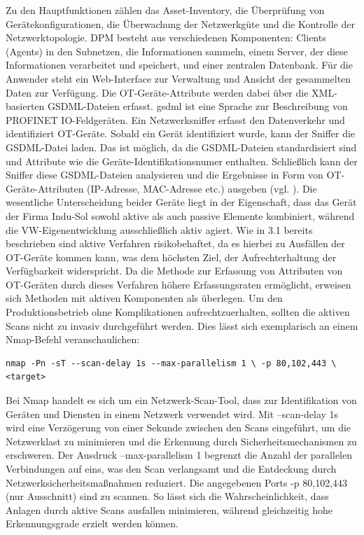 Zu den Hauptfunktionen zählen das Asset-Inventory, die Überprüfung von Gerätekonfigurationen, die Überwachung der Netzwerkgüte und die Kontrolle der Netzwerktopologie. DPM besteht aus verschiedenen Komponenten: Clients (Agents) in den Subnetzen, die Informationen sammeln, einem Server, der diese Informationen verarbeitet und speichert, und einer zentralen Datenbank. Für die Anwender steht ein Web-Interface zur Verwaltung und Ansicht der gesammelten Daten zur Verfügung. Die OT-Geräte-Attribute werden dabei über die XML-basierten GSDML-Dateien erfasst.  \ac{gsdml} ist eine Sprache zur Beschreibung von PROFINET IO-Feldgeräten. Ein Netzwerksniffer erfasst den Datenverkehr und identifiziert OT-Geräte. Sobald ein Gerät identifiziert wurde, kann der Sniffer die GSDML-Datei laden. Das ist möglich, da die GSDML-Dateien standardisiert sind und Attribute wie die Geräte-Identifikationsnumer enthalten. \noindent \clearpage Schließlich kann der Sniffer diese GSDML-Dateien analysieren und die Ergebnisse in Form von OT-Geräte-Attributen (IP-Adresse, MAC-Adresse etc.) ausgeben (vgl. \cite{SIEMENS}). Die wesentliche Unterscheidung beider Geräte liegt in der Eigenschaft, dass das Gerät der Firma Indu-Sol sowohl aktive als auch passive Elemente kombiniert, während die VW-Eigenentwicklung ausschließlich aktiv agiert. Wie in 3.1 bereits beschrieben sind aktive Verfahren risikobehaftet, da es hierbei zu Ausfällen der OT-Geräte kommen kann, was dem höchsten Ziel, der Aufrechterhaltung der Verfügbarkeit widerspricht. Da die Methode zur Erfassung von Attributen von OT-Geräten durch dieses Verfahren höhere Erfassungsraten ermöglicht, erweisen sich Methoden mit aktiven Komponenten als überlegen. Um den Produktionsbetrieb ohne Komplikationen aufrechtzuerhalten, sollten die aktiven Scans nicht zu invasiv durchgeführt werden. Dies lässt sich exemplarisch an einem Nmap-Befehl veranschaulichen: 

\bigskip
\begin{verbatim}
nmap -Pn -sT --scan-delay 1s --max-parallelism 1 \ -p 80,102,443 \
<target>
\end{verbatim}
\bigskip

\noindent Bei Nmap handelt es sich um ein Netzwerk-Scan-Tool, dass zur Identifikation von Geräten und Diensten in einem Netzwerk verwendet wird. Mit --scan-delay 1s wird eine Verzögerung von einer Sekunde zwischen den Scans eingeführt, um die Netzwerklast zu minimieren und die Erkennung durch Sicherheitsmechanismen zu erschweren. Der Ausdruck --max-parallelism 1 begrenzt die Anzahl der parallelen Verbindungen auf eins, was den Scan verlangsamt und die Entdeckung durch Netzwerksicherheitsmaßnahmen reduziert. Die angegebenen Ports -p 80,102,443 (nur Ausschnitt) sind zu scannen. So lässt sich die Wahrscheinlichkeit, dass Anlagen durch aktive Scans ausfallen minimieren, während gleichzeitig hohe Erkennungsgrade erzielt werden können.

